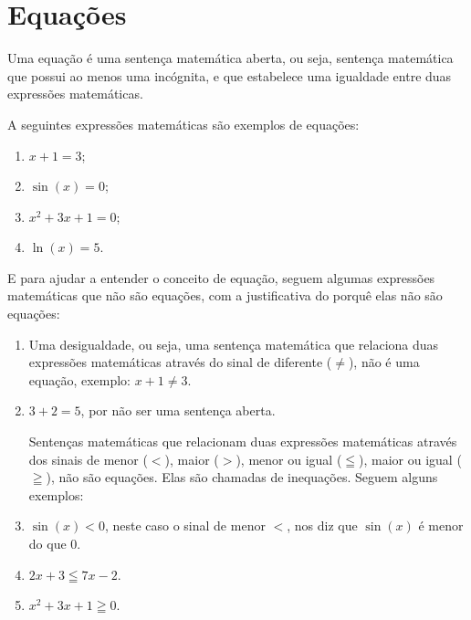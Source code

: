 
\chapter{Equações}

Uma equação é uma sentença matemática aberta, ou seja, sentença matemática que possui ao menos uma incógnita, e que estabelece uma igualdade entre duas expressões matemáticas.

 \begin{exem}
 A seguintes expressões matemáticas são exemplos de equações:

\begin{enumerate}[(1)]
 \item $x+1=3$;
 \item $\sin(x)=0$;
 \item $x^2+3x+1=0$;
 \item $\ln(x)= 5$.
\end{enumerate}
\end{exem}

 E para ajudar a entender o conceito de equação, seguem algumas expressões matemáticas que não são equações, com a justificativa do porquê elas não são equações:
\begin{exem}
\begin{enumerate}[(1)]
 \item Uma desigualdade, ou seja, uma sentença matemática que relaciona duas expressões matemáticas através do sinal de diferente ($\neq$), não é uma equação, exemplo: $x+1 \neq 3$.

 \item $3 + 2 = 5$, por não ser uma sentença aberta.

 Sentenças matemáticas que relacionam duas expressões matemáticas através dos sinais de menor ($<$), maior ($>$), menor ou igual ($\leqq$), maior ou igual ($\geqq$), não são equações. Elas são chamadas de inequações. Seguem alguns exemplos:

 \item $\sin(x) < 0$, neste caso o sinal de menor $<$, nos diz que $\sin(x)$ é menor do que $0$.
 \item $2x+3 \leqq 7x-2$.
 \item $x^2+3x+1 \geqq 0$.
\end{enumerate}
\end{exem}

